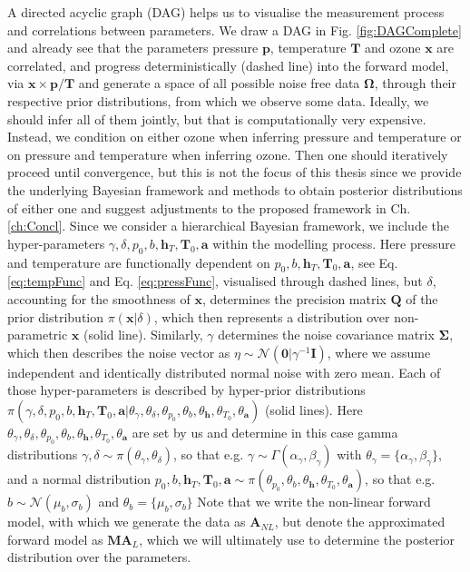 A directed acyclic graph (DAG) helps us to visualise the measurement process and correlations between parameters.
We draw a DAG in Fig. \ref{fig:DAGComplete} and already see that the parameters pressure $\bm{p}$, temperature $\bm{T}$ and ozone $\bm{x}$ are correlated, and progress deterministically (dashed line) into the forward model, via $\bm{x} \times \bm{p} / \bm{T}$ and generate a space of all possible noise free data $\bm{\Omega}$, through their respective prior distributions, from which we observe some data.
Ideally, we should infer all of them jointly, but that is computationally very expensive.
Instead, we condition on either ozone when inferring pressure and temperature or on pressure and temperature when inferring ozone.
Then one should iteratively proceed until convergence, but this is not the focus of this thesis since we provide the underlying Bayesian framework and methods to obtain posterior distributions of either one and suggest adjustments to the proposed framework in Ch. \ref{ch:Concl}.
Since we consider a hierarchical Bayesian framework, we include the hyper-parameters $\gamma, \delta, p_0, b, \bm{h}_T, \bm{T}_0, \bm{a}$ within the modelling process.
Here pressure and temperature are functionally dependent on $p_0, b, \bm{h}_T, \bm{T}_0, \bm{a}$, see Eq. \ref{eq:tempFunc} and Eq. \ref{eq:pressFunc}, visualised through dashed lines, but $\delta$, accounting for the smoothness of $\bm{x}$, determines the precision matrix $\bm{Q}$ of the prior distribution $\pi(\bm{x}|\delta)$, which then represents a distribution over non-parametric $\bm{x}$ (solid line).
Similarly, $\gamma$ determines the noise covariance matrix $\bm{\Sigma}$, which then describes the noise vector as $\eta \sim \mathcal{N}( \bm{0}| \gamma^{-1} \bm{I})$, where we assume independent and identically distributed normal noise with zero mean.
Each of those hyper-parameters is described by hyper-prior distributions $\pi(\gamma, \delta, p_0, b, \bm{h}_T, \bm{T}_0, \bm{a} |\theta_{\gamma}, \theta_{\delta},\theta_{p_0},\theta_{b},\theta_{\bm{h}},\theta_{T_0},\theta_{\bm{a}} )$ (solid lines).
Here $\theta_{\gamma}, \theta_{\delta},\theta_{p_0},\theta_{b},\theta_{\bm{h}},\theta_{T_0},\theta_{\bm{a}}$ are set by us and determine in this case gamma distributions $\gamma, \delta \sim \pi(\theta_{\gamma}, \theta_{\delta})$, so that e.g. $\gamma \sim \Gamma(\alpha_{\gamma},\beta_{\gamma}) $ with $\theta_{\gamma} = \{\alpha_{\gamma},\beta_{\gamma} \}$, and a normal distribution $p_0, b, \bm{h}_T, \bm{T}_0, \bm{a} \sim \pi( \theta_{p_0},\theta_{b},\theta_{\bm{h}},\theta_{T_0},\theta_{\bm{a}})$, so that e.g. $b \sim \mathcal{N}(\mu_b, \sigma_b)$ and $\theta_{b} = \{\mu_b, \sigma_b\}$
Note that we write the non-linear forward model, with which we generate the data as $\bm{A}_{NL}$, but denote the approximated forward model as $\bm{M} \bm{A}_L$, which we will ultimately use to determine the posterior distribution over the parameters.


